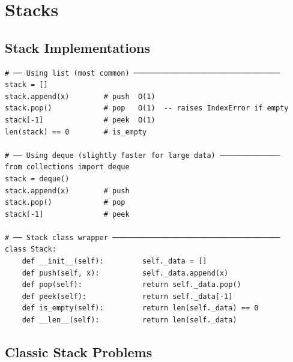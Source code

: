 \documentclass[11pt,a4paper]{report}
\begin{document}
\chapter{Stacks}

\section{Stack Implementations}

\begin{lstlisting}
# ── Using list (most common) ──────────────────────────────────
stack = []
stack.append(x)        # push  O(1)
stack.pop()            # pop   O(1)  -- raises IndexError if empty
stack[-1]              # peek  O(1)
len(stack) == 0        # is_empty

# ── Using deque (slightly faster for large data) ──────────────
from collections import deque
stack = deque()
stack.append(x)        # push
stack.pop()            # pop
stack[-1]              # peek

# ── Stack class wrapper ───────────────────────────────────────
class Stack:
    def __init__(self):         self._data = []
    def push(self, x):          self._data.append(x)
    def pop(self):              return self._data.pop()
    def peek(self):             return self._data[-1]
    def is_empty(self):         return len(self._data) == 0
    def __len__(self):          return len(self._data)
\end{lstlisting}

\section{Classic Stack Problems}
\end{document}

